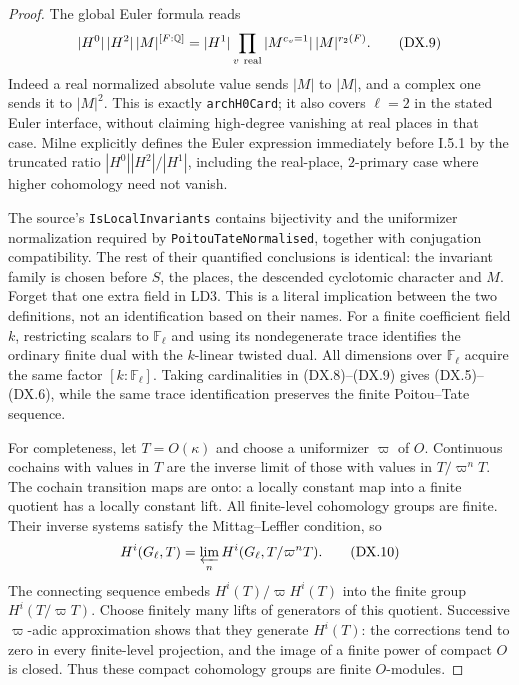 \begin{proof}
The global Euler formula reads
\[
 |H^0|\,|H^2|\,|M|^{[F:\mathbb Q]}
   =|H^1|
     \prod_{v\ {\rm real}}|M^{c_v=1}|\,
                       |M|^{r_2(F)}.
 \tag{DX.9}
\]
Indeed a real normalized absolute value sends $|M|$ to $|M|$,
and a complex one sends it to $|M|^2$.
This is exactly \texttt{archH0Card}; it also covers $\ell=2$
in the stated Euler interface, without claiming high-degree
vanishing at real places in that case.
Milne explicitly defines the Euler expression immediately
before I.5.1 by the truncated ratio $|H^0||H^2|/|H^1|$,
including the real-place, $2$-primary case where higher
cohomology need not vanish.

The source's \texttt{IsLocalInvariants} contains bijectivity and
the uniformizer normalization required by
\texttt{PoitouTateNormalised}, together with conjugation
compatibility.  The rest of their quantified conclusions is
identical: the invariant family is chosen before $S$, the places,
the descended cyclotomic character and $M$.
Forget that one extra field in LD3.
This is a literal implication between the two definitions,
not an identification based on their names.
For a finite coefficient field $k$, restricting scalars to
$\mathbb F_\ell$ and using its nondegenerate trace identifies
the ordinary finite dual with the $k$-linear twisted dual.
All dimensions over $\mathbb F_\ell$ acquire the same factor
$[k:\mathbb F_\ell]$.  Taking cardinalities in (DX.8)--(DX.9)
gives (DX.5)--(DX.6), while the same trace identification
preserves the finite Poitou--Tate sequence.

For completeness, let $T=O(\kappa)$ and choose a uniformizer
$\varpi$ of $O$.  Continuous cochains with values in $T$ are
the inverse limit of those with values in $T/\varpi^nT$.
The cochain transition maps are onto: a locally constant map
into a finite quotient has a locally constant lift.
All finite-level cohomology groups are finite.  Their inverse
systems satisfy the Mittag--Leffler condition, so
\[
 H^i(G_\ell,T)=\varprojlim_nH^i(G_\ell,T/\varpi^nT).
 \tag{DX.10}
\]
The connecting sequence embeds
$H^i(T)/\varpi H^i(T)$ into the finite group $H^i(T/\varpi T)$.
Choose finitely many lifts of generators of this quotient.
Successive $\varpi$-adic approximation shows that they generate
$H^i(T)$: the corrections tend to zero in every finite-level
projection, and the image of a finite power of compact $O$
is closed.  Thus these compact cohomology groups are finite
$O$-modules.


\end{proof}
